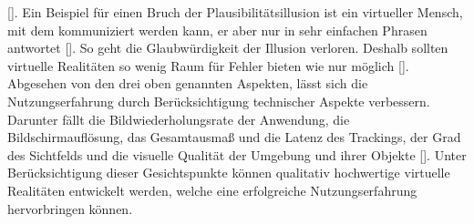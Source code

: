 \documentclass[a4paper,12pt,oneside]{article}
\begin{document}
        [\cite{Slater2009}].
        Ein Beispiel für einen Bruch der Plausibilitätsillusion ist ein virtueller Mensch,
        mit dem kommuniziert werden kann, er aber nur in sehr einfachen Phrasen antwortet
        [\cite[19]{Dorner2013}]. So geht die Glaubwürdigkeit der Illusion verloren. 
        Deshalb 
        sollten virtuelle Realitäten so wenig Raum für Fehler bieten wie nur 
        möglich [\cite{Slater2009}]. \\
        Abgesehen von den drei oben genannten Aspekten, lässt sich die Nutzungserfahrung durch
        Berücksichtigung technischer Aspekte verbessern. Darunter fällt die
        Bildwiederholungsrate der Anwendung, die Bildschirmauflösung, das Gesamtausmaß und
        die Latenz des Trackings, der Grad des Sichtfelds und die visuelle Qualität der Umgebung
        und ihrer Objekte [\cite{Slater2009}].
        Unter Berücksichtigung dieser Gesichtspunkte können qualitativ hochwertige
        virtuelle Realitäten entwickelt werden, welche eine erfolgreiche 
        Nutzungserfahrung hervorbringen können.
\end{document}
